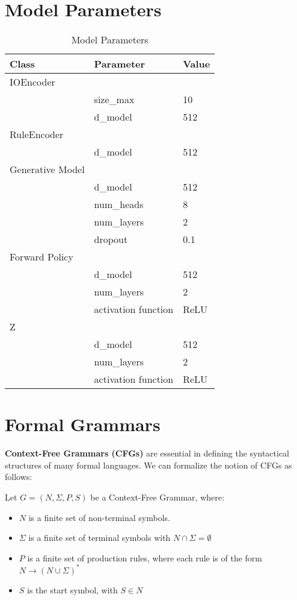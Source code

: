 \section{Model Parameters}
\begin{table}[h!]
    \centering
    \begin{tabular}{|l|l|l|}
    \hline
    \textbf{Class} & \textbf{Parameter} & \textbf{Value} \\
    \hline
    IOEncoder &  &  \\
     & size\_max & 10 \\
     & d\_model & 512 \\
    \hline
    RuleEncoder & & \\
     & d\_model & 512 \\
    \hline
    Generative Model &  & \\
     & d\_model & 512 \\
     & num\_heads & 8 \\
     & num\_layers & 2 \\
     & dropout & 0.1 \\
    \hline
    Forward Policy & & \\
    & d\_model & 512 \\
    & num\_layers & 2 \\
    & activation function & ReLU \\
    \hline
    Z & & \\
    & d\_model & 512 \\
    & num\_layers & 2 \\
    & activation function & ReLU \\
    \hline
    \end{tabular}
    \caption{Model Parameters}
    \label{table:params}
    \end{table}

\clearpage
\section{Formal Grammars}\label{app:cfg}

\textbf{Context-Free Grammars (CFGs)} are essential in defining the syntactical structures of many formal languages.
We can formalize the notion of CFGs as follows:

Let \( G = (N, \Sigma, P, S) \) be a Context-Free Grammar, where:

\begin{itemize}
    \item \( N \) is a finite set of non-terminal symbols.
    \item \( \Sigma \) is a finite set of terminal symbols with \newline \( N \cap \Sigma = \emptyset \)
    \item \( P \) is a finite set of production rules, where each rule is of the form \( N \rightarrow (N \cup \Sigma)^* \)
    \item \( S \) is the start symbol, with \( S \in N \)
\end{itemize}

